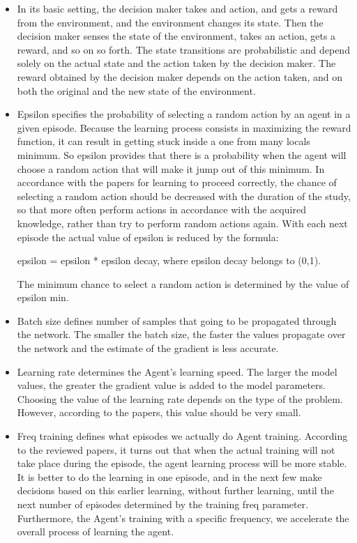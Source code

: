 \documentclass{article}
\begin{document}
\begin{itemize}
\item In its basic setting, the decision maker takes and action, and gets a reward from the environment, and the environment changes its state. Then the decision maker senses the state of the environment, takes an action, gets a reward, and so on so forth. The state transitions are probabilistic and depend solely on the actual state and the action taken by the decision maker. The reward obtained by the decision maker depends on the action taken, and on both the original and the new state of the environment.

\item Epsilon specifies the probability of selecting a random action by an agent in a given episode.
Because the learning process consists in maximizing the reward function, it can result in getting stuck inside a one from many locals minimum.
So epsilon provides that there is a probability when the agent will choose a random action that will make it jump out of this minimum. In accordance with the papers for learning to proceed correctly,
the chance of selecting a random action should be decreased with the duration of the study,
so that more often perform actions in accordance with the acquired knowledge, rather than try to perform random actions again.
\newpage 
With each next episode the actual value of epsilon is reduced by the formula:

epsilon = epsilon * epsilon decay, where epsilon decay belongs to (0,1).

The minimum chance to select a random action is determined by the value of epsilon min.

\item Batch size defines number of samples that going to be propagated through the network.
The smaller the batch size, the faster the values propagate over the network and the estimate of the gradient is less accurate.

\item Learning rate determines the Agent's learning speed. 
The larger the model values, the greater the gradient value is added to the model parameters. 
Choosing the value of the learning rate depends on the type of the problem. 
However, according to the papers, this value should be very small.

\item Freq training defines what episodes we actually do Agent training.
According to the reviewed papers, it turns out that when the actual training will not take place during the episode, 
the agent learning process will be more stable. It is better to do the learning in one episode, and in the next few make decisions based on this earlier learning, without further learning, until the next number of episodes determined by the training freq parameter. Furthermore, the Agent's training with a specific frequency, we accelerate the overall process of learning the agent.


\end{itemize}
\end{document}
